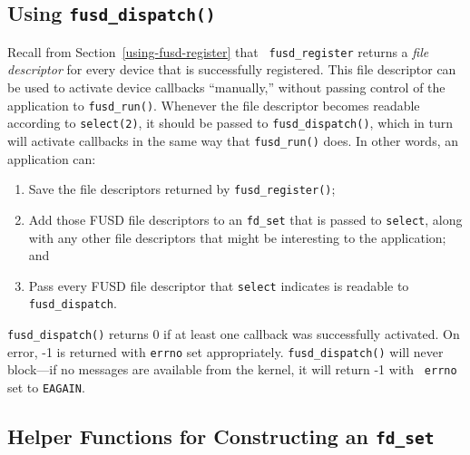 \documentclass{article}
\begin{document}
\subsection{Using {\tt fusd\_dispatch()}}

Recall from Section~\ref{using-fusd-register} that {\tt
fusd\_register} returns a {\em file descriptor} for every device that
is successfully registered.  This file descriptor can be used to
activate device callbacks ``manually,'' without passing control of the
application to {\tt fusd\_run()}.  Whenever the file descriptor
becomes readable according to {\tt select(2)}, it should be passed to
{\tt fusd\_dispatch()}, which in turn will activate callbacks in the
same way that {\tt fusd\_run()} does.  In other words, an application
can:
\begin{enumerate}
\item Save the file descriptors returned by {\tt fusd\_register()};
\item Add those FUSD file descriptors to an {\tt fd\_set} that is
passed to {\tt select}, along with any other file
descriptors that might be interesting to the application; and
\item Pass every FUSD file descriptor that {\tt select} indicates is
readable to {\tt fusd\_dispatch}.
\end{enumerate}

{\tt fusd\_dispatch()} returns 0 if at least one callback was
successfully activated.  On error, -1 is returned with {\tt errno} set
appropriately.  {\tt fusd\_dispatch()} will never block---if no
messages are available from the kernel, it will return -1 with {\tt
errno} set to {\tt EAGAIN}.

\subsection{Helper Functions for Constructing an {\tt fd\_set}}
\end{document}
